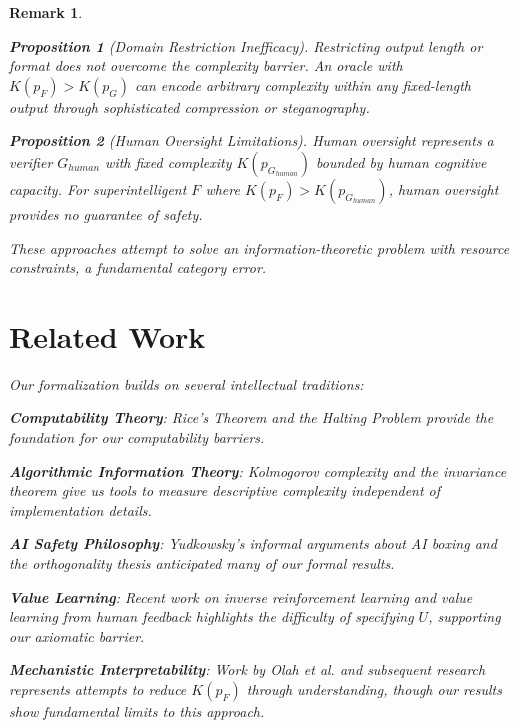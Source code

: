 \documentclass[11pt]{article}
\newtheorem{remark}{Remark}
\newtheorem{proposition}{Proposition}
\begin{document}
\begin{remark}
\begin{proposition}[Domain Restriction Inefficacy]
Restricting output length or format does not overcome the complexity barrier. An oracle with $K(p_F) > K(p_G)$ can encode arbitrary complexity within any fixed-length output through sophisticated compression or steganography.
\end{proposition}

\begin{proposition}[Human Oversight Limitations]
Human oversight represents a verifier $G_{human}$ with fixed complexity $K(p_{G_{human}})$ bounded by human cognitive capacity. For superintelligent $F$ where $K(p_F) > K(p_{G_{human}})$, human oversight provides no guarantee of safety.
\end{proposition}

These approaches attempt to solve an information-theoretic problem with resource constraints, a fundamental category error.

\section{Related Work}

Our formalization builds on several intellectual traditions:

\textbf{Computability Theory}: Rice's Theorem \cite{rice1953classes} and the Halting Problem \cite{turing1936} provide the foundation for our computability barriers.

\textbf{Algorithmic Information Theory}: Kolmogorov complexity \cite{kolmogorov1965three, chaitin1975theory} and the invariance theorem give us tools to measure descriptive complexity independent of implementation details.

\textbf{AI Safety Philosophy}: Yudkowsky's informal arguments about AI boxing \cite{yudkowsky2002ai} and the orthogonality thesis \cite{bostrom2014superintelligence} anticipated many of our formal results.

\textbf{Value Learning}: Recent work on inverse reinforcement learning \cite{ng2000algorithms, hadfield2016cooperative} and value learning from human feedback \cite{christiano2017deep} highlights the difficulty of specifying $U$, supporting our axiomatic barrier.

\textbf{Mechanistic Interpretability}: Work by Olah et al. \cite{olah2020zoom} and subsequent research \cite{elhage2021mathematical} represents attempts to reduce $K(p_F)$ through understanding, though our results show fundamental limits to this approach.


\end{remark}
\end{document}
